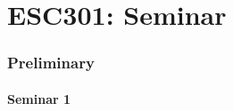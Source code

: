 \documentclass[10pt]{article}
\begin{document}
\part{ESC301: Seminar}

\section{Preliminary}
\subsection{Seminar 1}



\end{document}
